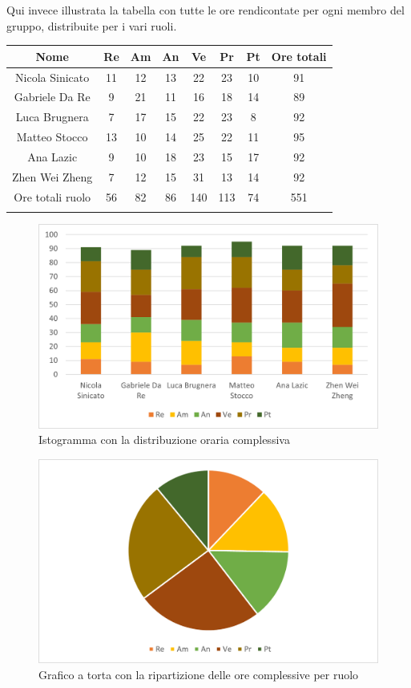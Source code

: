 Qui invece illustrata la tabella con tutte le ore rendicontate per ogni membro del gruppo, distribuite per i vari ruoli.
\setlength\extrarowheight{5pt}
\begin{tabularx}{\textwidth}{|ccccccc|c|}
	\hline
	\rowcolor{white}
	\textbf{Nome} & \textbf{Re} & \textbf{Am} & \textbf{An} & \textbf{Ve} & \textbf{Pr}& \textbf{Pt} & \textbf{Ore totali} \\
	\hline
	Nicola Sinicato &11&12&13&22&23&10&91 \\
	Gabriele Da Re &9&21&11&16&18&14&89 \\
	Luca Brugnera &7&17&15&22&23&8&92 \\
	Matteo Stocco &13&10&14&25&22&11&95 \\
	Ana Lazic &9&10&18&23&15&17&92 \\
	Zhen Wei Zheng &7&12&15&31&13&14&92 \\
	\hline
	Ore totali ruolo &56&82&86&140&113&74&551 \\
	\hline
	\rowcolor{white}
	\caption{Ripartizione complessiva delle ore per ruolo e persona}
\end{tabularx}

\begin{figure}[H]
	\centering
	\includegraphics[scale=0.8]{img/consuntivo_membri.png}
	\caption{Istogramma con la distribuzione oraria complessiva}
\end{figure}
\begin{figure}[H]
	\centering
	\includegraphics[scale=0.8]{img/consuntivo_ruoli.png}
	\caption{Grafico a torta con la ripartizione delle ore complessive per ruolo}
\end{figure}
